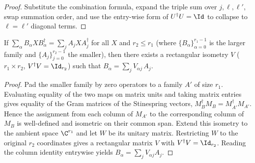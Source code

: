 \begin{proof}
    \leanok
    Substitute the combination formula, expand the triple sum over
    $j,\ell,\ell'$, swap summation order, and use the entry-wise form
    of $U^\dagger U = \Id$ to collapse to $\ell = \ell'$ diagonal terms.
\end{proof}

\begin{theorem}\label{thm:kraus_rectangular_freedom}
    \leanok
    If $\sum_\alpha B_\alpha X B_\alpha^\dagger = \sum_j A_j X A_j^\dagger$
    for all $X$ and $r_2 \le r_1$ (where $\{B_\alpha\}_{\alpha=0}^{r_1-1}$
    is the larger family and $\{A_j\}_{j=0}^{r_2-1}$ the smaller),
    then there exists a rectangular isometry
    $V$ ($r_1 \times r_2$, $V^\dagger V = \Id_{r_2}$) such that
    $B_\alpha = \sum_j V_{\alpha j}\,A_j$.
\end{theorem}

\begin{proof}
    \leanok
    Pad the smaller family by zero operators to a family $A'$ of size $r_1$.
    Evaluating equality of the two maps on matrix units and taking matrix
    entries gives equality of the Gram matrices of the Stinespring vectors,
    $M_B^\dagger M_B=M_{A'}^\dagger M_{A'}$.  Hence the assignment from
    each column of $M_{A'}$ to the corresponding column of $M_B$ is
    well-defined and isometric on their common span.  Extend this isometry to
    the ambient space $\C^{r_1}$ and let $W$ be its unitary matrix.  Restricting
    $W$ to the original $r_2$ coordinates gives a rectangular matrix $V$ with
    $V^\dagger V=\Id_{r_2}$.  Reading the column identity entrywise yields
    $B_\alpha=\sum_jV_{\alpha j}A_j$.
\end{proof}
